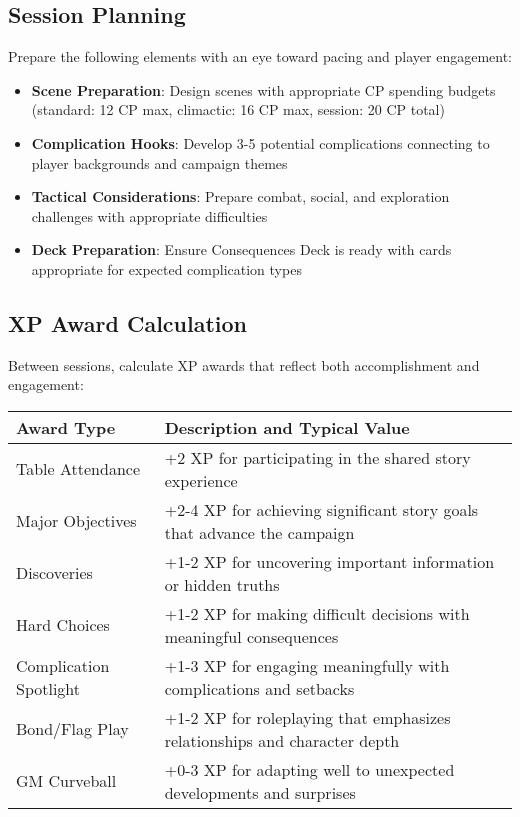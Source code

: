 \subsection*{Session Planning}

Prepare the following elements with an eye toward pacing and player engagement:

\begin{itemize}
    \item \textbf{Scene Preparation}: Design scenes with appropriate CP spending budgets (standard: 12 CP max, climactic: 16 CP max, session: 20 CP total)
    \item \textbf{Complication Hooks}: Develop 3-5 potential complications connecting to player backgrounds and campaign themes
    \item \textbf{Tactical Considerations}: Prepare combat, social, and exploration challenges with appropriate difficulties
    \item \textbf{Deck Preparation}: Ensure Consequences Deck is ready with cards appropriate for expected complication types
\end{itemize}

\subsection*{XP Award Calculation}

Between sessions, calculate XP awards that reflect both accomplishment and engagement:

\begin{fatebox}
\begin{tabularx}{\textwidth}{lX}
\toprule
\textbf{Award Type} & \textbf{Description and Typical Value} \\
\midrule
Table Attendance & +2 XP for participating in the shared story experience \\
Major Objectives & +2-4 XP for achieving significant story goals that advance the campaign \\
Discoveries & +1-2 XP for uncovering important information or hidden truths \\
Hard Choices & +1-2 XP for making difficult decisions with meaningful consequences \\
Complication Spotlight & +1-3 XP for engaging meaningfully with complications and setbacks \\
Bond/Flag Play & +1-2 XP for roleplaying that emphasizes relationships and character depth \\
GM Curveball & +0-3 XP for adapting well to unexpected developments and surprises \\
\bottomrule
\end{tabularx}
\end{fatebox}

